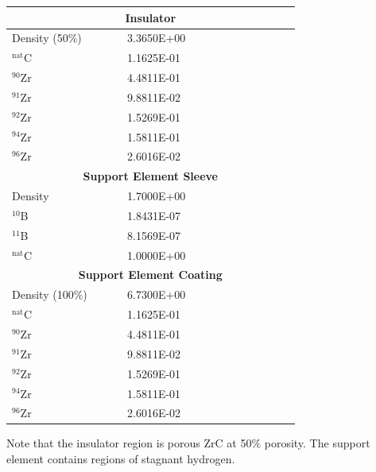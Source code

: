 \documentclass[8pt,a5paper]{article}
\begin{document}
\begin{longtable}{|m{0.3\linewidth}|m{0.45\linewidth}|}
    \multicolumn{2}{|c|}{\textbf{Insulator}}\\\hline
    Density (50\%) & \SI{3.3650E+00}{} \\
    $^{\text{nat}}$C & \SI{1.1625E-01}{} \\
    $^{90}$Zr & \SI{4.4811E-01}{} \\
    $^{91}$Zr & \SI{9.8811E-02}{} \\
    $^{92}$Zr & \SI{1.5269E-01}{} \\
    $^{94}$Zr & \SI{1.5811E-01}{} \\
    $^{96}$Zr & \SI{2.6016E-02}{} \\\hline
    \multicolumn{2}{|c|}{\textbf{Support Element Sleeve}}\\\hline
    Density & \SI{1.7000E+00}{} \\
    $^{10}$B & \SI{1.8431E-07}{} \\
    $^{11}$B & \SI{8.1569E-07}{} \\
    $^{\text{nat}}$C & \SI{1.0000E+00}{} \\\hline
    \multicolumn{2}{|c|}{\textbf{Support Element Coating}}\\\hline
    Density (100\%) & \SI{6.7300E+00}{} \\
    $^{\text{nat}}$C & \SI{1.1625E-01}{} \\
    $^{90}$Zr & \SI{4.4811E-01}{} \\
    $^{91}$Zr & \SI{9.8811E-02}{} \\
    $^{92}$Zr & \SI{1.5269E-01}{} \\
    $^{94}$Zr & \SI{1.5811E-01}{} \\
    $^{96}$Zr & \SI{2.6016E-02}{} \\
\end{longtable}

Note that the insulator region is porous ZrC at 50\% porosity. The support
element contains regions of stagnant hydrogen.\pagebreak
\end{document}
